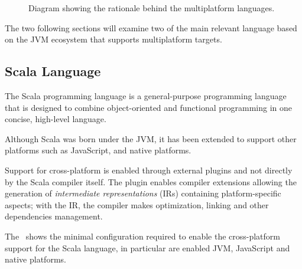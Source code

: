 \begin{figure}
	\centering
	\caption{Diagram showing the rationale behind the multiplatform languages.}
	\label{fig:mulitplatform-languages}
\end{figure}

The two following sections will examine two of the main relevant language based on the JVM ecosystem that supports multiplatform targets.

\subsection{Scala Language}
\label{sec:scala-language}

The Scala programming language is a general-purpose programming language that is designed to combine object-oriented and functional programming in one
concise, high-level language.

Although Scala was born under the JVM, it has been extended to support other platforms such as JavaScript, and native platforms.

Support for cross-platform is enabled through external plugins and not directly by the Scala compiler itself.
The plugin enables compiler extensions allowing the generation of \emph{intermediate representations} (IRs) containing platform-specific aspects;
with the IR, the compiler makes optimization, linking and other dependencies management.

The~ shows the minimal configuration required to enable the cross-platform support for the Scala language,
in particular are enabled JVM, JavaScript and native platforms.



